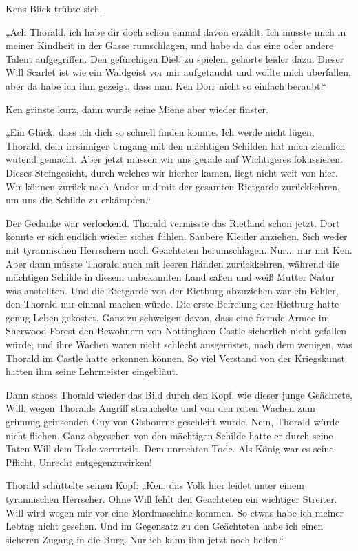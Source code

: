 Kens Blick trübte sich.

„Ach Thorald, ich habe dir doch schon einmal davon erzählt. Ich musste mich in meiner Kindheit in der Gasse rumschlagen, und habe da das eine oder andere Talent aufgegriffen. Den gefürchigen Dieb zu spielen, gehörte leider dazu. Dieser Will Scarlet ist wie ein Waldgeist vor mir aufgetaucht und wollte mich überfallen, aber da habe ich ihm gezeigt, dass man Ken Dorr nicht so einfach beraubt.“

Ken grinste kurz, dann wurde seine Miene aber wieder finster.

„Ein Glück, dass ich dich so schnell finden konnte. Ich werde nicht lügen, Thorald, dein irrsinniger Umgang mit den mächtigen Schilden hat mich ziemlich wütend gemacht. Aber jetzt müssen wir uns gerade auf Wichtigeres fokussieren. Dieses Steingesicht, durch welches wir hierher kamen, liegt nicht weit von hier. Wir können zurück nach Andor und mit der gesamten Rietgarde zurückkehren, um uns die Schilde zu erkämpfen.“

Der Gedanke war verlockend. Thorald vermisste das Rietland schon jetzt. Dort könnte er sich endlich wieder sicher fühlen. Saubere Kleider anziehen. Sich weder mit tyrannischen Herrschern noch Geächteten herumschlagen. Nur... nur mit Ken. Aber dann müsste Thorald auch mit leeren Händen zurückkehren, während die mächtigen Schilde in diesem unbekannten Land saßen und weiß Mutter Natur was anstellten. Und die Rietgarde von der Rietburg abzuziehen war ein Fehler, den Thorald nur einmal machen würde. Die erste Befreiung der Rietburg hatte genug Leben gekostet. Ganz zu schweigen davon, dass eine fremde Armee im Sherwood Forest den Bewohnern von Nottingham Castle sicherlich nicht gefallen würde, und ihre Wachen waren nicht schlecht ausgerüstet, nach dem wenigen, was Thorald im Castle hatte erkennen können. So viel Verstand von der Kriegskunst hatten ihm seine Lehrmeister eingebläut.

Dann schoss Thorald wieder das Bild durch den Kopf, wie dieser junge Geächtete, Will, wegen Thoralds Angriff strauchelte und von den roten Wachen zum grimmig grinsenden Guy von Gisbourne geschleift wurde. Nein, Thorald würde nicht fliehen. Ganz abgesehen von den mächtigen Schilde hatte er durch seine Taten Will dem Tode verurteilt. Dem unrechten Tode. Als König war es seine Pflicht, Unrecht entgegenzuwirken!

Thorald schüttelte seinen Kopf: „Ken, das Volk hier leidet unter einem tyrannischen Herrscher. Ohne Will fehlt den Geächteten ein wichtiger Streiter. Will wird wegen mir vor eine Mordmaschine kommen. So etwas habe ich meiner Lebtag nicht gesehen. Und im Gegensatz zu den Geächteten habe ich einen sicheren Zugang in die Burg. Nur ich kann ihm jetzt noch helfen.“

